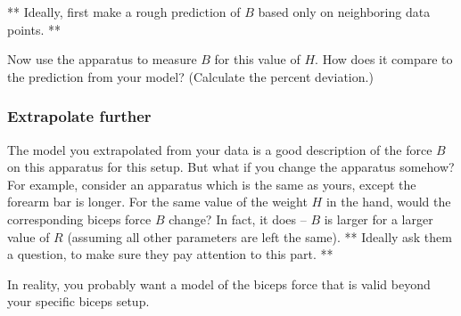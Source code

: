 \documentclass[11pt,letterpaper]{article}
\begin{document}
** Ideally, first make a rough prediction of $B$ based only on neighboring data
points. **

Now use the apparatus to measure $B$ for this value of $H$.  How does it
compare to the prediction from your model?  
(Calculate the percent deviation.)

\subsubsection*{Extrapolate further}
The model you extrapolated from your data is a good description of the 
force $B$ on this apparatus for this setup.  But what if you change the
apparatus somehow?  For example, consider an apparatus which
is the same as yours, except the forearm bar is longer.
For the same value of the weight $H$ in the hand, 
would the corresponding biceps force $B$ change? 
In fact, it does -- $B$ is larger for a larger value of $R$ 
(assuming all other parameters are left the same).
** Ideally ask them a question, to make sure they pay attention to this part.
**

In reality, you probably want a model of the biceps force that is valid 
beyond your specific biceps setup.  
\end{document}
